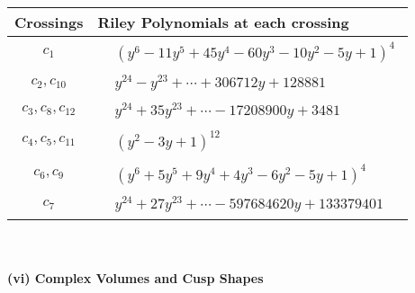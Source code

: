 \documentclass[1p]{elsarticle_modified}
\theoremstyle{definition}
\begin{document}
\begin{tabular}{m{50pt}|m{274pt}}
Crossings & \hspace{64pt}Riley Polynomials at each crossing \\
\hline $$\begin{aligned}c_{1}\end{aligned}$$&$\begin{aligned}
&(y^6-11 y^5+45 y^4-60 y^3-10 y^2-5 y+1)^4
\end{aligned}$\\
\hline $$\begin{aligned}c_{2},c_{10}\end{aligned}$$&$\begin{aligned}
&y^{24}- y^{23}+\cdots+306712 y+128881
\end{aligned}$\\
\hline $$\begin{aligned}c_{3},c_{8},c_{12}\end{aligned}$$&$\begin{aligned}
&y^{24}+35 y^{23}+\cdots-17208900 y+3481
\end{aligned}$\\
\hline $$\begin{aligned}c_{4},c_{5},c_{11}\end{aligned}$$&$\begin{aligned}
&(y^2-3 y+1)^{12}
\end{aligned}$\\
\hline $$\begin{aligned}c_{6},c_{9}\end{aligned}$$&$\begin{aligned}
&(y^6+5 y^5+9 y^4+4 y^3-6 y^2-5 y+1)^4
\end{aligned}$\\
\hline $$\begin{aligned}c_{7}\end{aligned}$$&$\begin{aligned}
&y^{24}+27 y^{23}+\cdots-597684620 y+133379401
\end{aligned}$\\
\hline
\end{tabular}\\~\\
\newpage\flushleft \textbf{(vi) Complex Volumes and Cusp Shapes}
\end{document}
